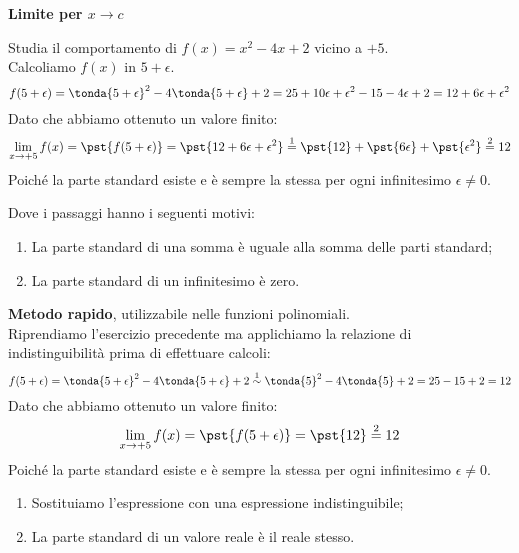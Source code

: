 \begin{esempio}
\textbf{Limite per \(x \to c\)}

Studia il comportamento di \(f(x) = x^2-4x+2\) vicino a \(+5\).\\
Calcoliamo \(f(x)\) in \(5+\epsilon\).
\[
f(5+\epsilon)=\tonda{5+\epsilon}^2-4\tonda{5+\epsilon}+2 = 
  25 + 10 \epsilon + \epsilon^2 - 15 - 4\epsilon + 2 =
  12 + 6 \epsilon +\epsilon^2
\]
Dato che abbiamo ottenuto un valore finito:
\[\lim_{x \to +5}f(x) = 
  \pst{f(5+\epsilon)} = \pst{12 + 6 \epsilon +\epsilon^2} \stackrel{1}{=} 
  \pst{12} + \pst{6 \epsilon} + \pst{\epsilon^2} \stackrel{2}{=} 12\]
Poiché la parte standard esiste e è sempre la stessa per ogni 
infinitesimo \(\epsilon \neq 0\). 

Dove i passaggi hanno i seguenti motivi:
\begin{enumerate} [nosep]
\item La parte standard di una somma è uguale alla somma delle parti 
standard;
\item La parte standard di un infinitesimo è zero.
\end{enumerate}
\end{esempio}

\begin{esempio}
\textbf{Metodo rapido}, utilizzabile nelle funzioni polinomiali. \\
Riprendiamo l'esercizio precedente ma applichiamo la relazione di 
indistinguibilità prima di effettuare calcoli:
\[
f(5+\epsilon)=
\tonda{5+\epsilon}^2-4\tonda{5+\epsilon}+2 \stackrel{1}{\sim} 
  \tonda{5}^2-4\tonda{5}+2 = 25 - 15 + 2 = 12
\]
Dato che abbiamo ottenuto un valore finito:
\[\lim_{x \to +5}f(x) = 
  \pst{f(5+\epsilon)} = \pst{12} \stackrel{2}{=} 12\]
Poiché la parte standard esiste e è sempre la stessa per ogni 
infinitesimo \(\epsilon \neq 0\). 

\begin{enumerate} [nosep]
 \item Sostituiamo l'espressione con una espressione indistinguibile;
 \item La parte standard di un valore reale è il reale stesso.
\end{enumerate}
\end{esempio}

